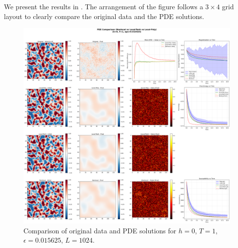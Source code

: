 \documentclass[11pt,a4paper]{article}
\begin{document}
We present the results in . The arrangement of the figure follows a $3 \times 4$ grid layout to clearly compare the original data and the PDE solutions.  



\begin{figure}[!h]
    \centering
    \includegraphics[width=1.0\textwidth]{fig/compare_pde_solvers_L1024_h0_T1_eps0.015625.png}
    \caption{Comparison of original data and PDE solutions for $h=0$, $T=1$, $\epsilon=0.015625$, $L=1024$.}
    \label{fig:pde_comparison_h0_T1_eps0.015625}
\end{figure}
\end{document}
